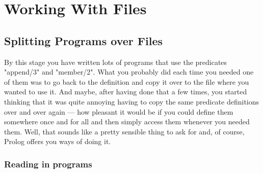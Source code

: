 
\chapter{Working With Files}\label{CHAPTER12}



\section{Splitting Programs over Files}\label{SEC.L12.SPLITTING.PROGRAMS}

By this stage you have written lots of programs that use the
predicates "append/3" and "member/2". What you probably did each time
you needed one of them was to go back to the definition and copy it
over to the file where you wanted to use it. And maybe, after having
done that a few times, you started thinking that it was quite annoying
having to copy the same predicate definitions over and over again ---
how pleasant it would be if you could define them somewhere once and
for all and then simply access them whenever you needed them. Well,
that sounds like a pretty sensible thing to ask for and, of course,
Prolog offers you ways of doing it.



\subsection*{Reading in programs}\label{SUBSEC.L12.READING.PROGRAMS}

